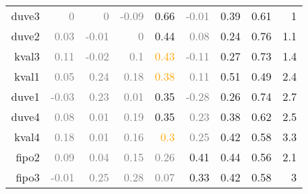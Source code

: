 \documentclass[10pt,a4paper]{article}
\begin{document}
\begin{table}[htbp]
\begin{tabular}{r|rrrrrrrr}
    duve3 & \textcolor{Gray}{0} & \textcolor{Gray}{0} & \textcolor{Gray}{-0.09} & \textcolor{NavyBlue}{0.66} & \textcolor{Gray}{-0.01} & 0.39  & 0.61  & 1 \\
    duve2 & \textcolor{Gray}{0.03} & \textcolor{Gray}{-0.01} & \textcolor{Gray}{0} & \textcolor{NavyBlue}{0.44} & \textcolor{Gray}{0.08} & 0.24  & 0.76  & 1.1 \\
    kval3 & \textcolor{Gray}{0.11} & \textcolor{Gray}{-0.02} & \textcolor{Gray}{0.1} & \textcolor{Orange}{0.43} & \textcolor{Gray}{-0.11} & 0.27  & 0.73  & 1.4 \\
    kval1 & \textcolor{Gray}{0.05} & \textcolor{Gray}{0.24} & \textcolor{Gray}{0.18} & \textcolor{Orange}{0.38} & \textcolor{Gray}{0.11} & 0.51  & 0.49  & 2.4 \\
    duve1 & \textcolor{Gray}{-0.03} & \textcolor{Gray}{0.23} & \textcolor{Gray}{0.01} & \textcolor{NavyBlue}{0.35} & \textcolor{Gray}{-0.28} & 0.26  & 0.74  & 2.7 \\
    duve4 & \textcolor{Gray}{0.08} & \textcolor{Gray}{0.01} & \textcolor{Gray}{0.19} & \textcolor{NavyBlue}{0.35} & \textcolor{Gray}{0.23} & 0.38  & 0.62  & 2.5 \\
    kval4 & \textcolor{Gray}{0.18} & \textcolor{Gray}{0.01} & \textcolor{Gray}{0.16} & \textcolor{Orange}{0.3} & \textcolor{Gray}{0.25} & 0.42  & 0.58  & 3.3 \\
    fipo2 & \textcolor{Gray}{0.09} & \textcolor{Gray}{0.04} & \textcolor{Gray}{0.15} & \textcolor{Gray}{0.26} & \textcolor{NavyBlue}{0.41} & 0.44  & 0.56  & 2.1 \\
    fipo3 & \textcolor{Gray}{-0.01} & \textcolor{Gray}{0.25} & \textcolor{Gray}{0.28} & \textcolor{Gray}{0.07} & \textcolor{NavyBlue}{0.33} & 0.42  & 0.58  & 3 \\
    \end{tabular}%
  \label{tab:addlabel}%
\end{table}%
\end{document}
